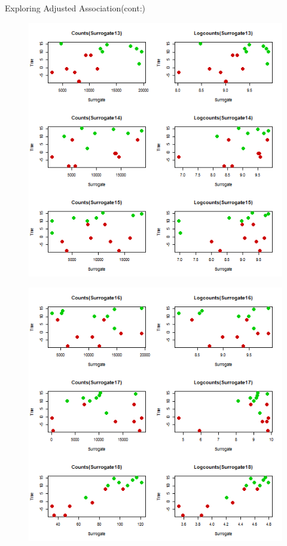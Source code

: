 \documentclass[a4paper,9pt]{beamer}\usepackage[]{graphicx}\usepackage[]{color}
\begin{document}
\begin{frame}{Exploring Adjusted Association(cont:)}
\begin{minipage}{0.3\textwidth}
\begin{figure}[H]
\includegraphics[scale=0.3]{first_presentation-figure/exploration-5.png}
\end{figure}
\end{minipage}
\hfill
\begin{minipage}{0.40\textwidth}
\begin{figure}[H]
\includegraphics[scale=0.3]{first_presentation-figure/exploration-6.png}
\end{figure}

\end{minipage}
\end{frame}
\end{document}
